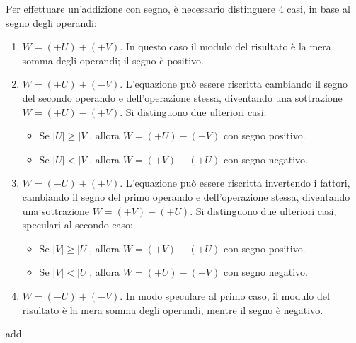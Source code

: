 Per effettuare un'addizione con segno, è necessario distinguere 4 casi, in base al segno degli operandi:
\begin{enumerate}
	\item $W = (+U) + (+V)$. In questo caso il modulo del risultato è la mera somma degli operandi; il segno è positivo.
	\item $W = (+U) + (-V)$. L'equazione può essere riscritta cambiando il segno del secondo operando e dell'operazione stessa, diventando una sottrazione $W = (+U) - (+V)$. Si distinguono due ulteriori casi:
	\begin{itemize}
		\item Se $\lvert U \rvert \geq \lvert V \rvert$, allora $W = (+U) - (+V)$ con segno positivo.
		\item Se $\lvert U \rvert < \lvert V \rvert$, allora $W = (+V) - (+U)$ con segno negativo.
	\end{itemize}
	\item $W = (-U) + (+V)$. L'equazione può essere riscritta invertendo i fattori, cambiando il segno del primo operando e dell'operazione stessa, diventando una sottrazione $W = (+V) - (+U)$. Si distinguono due ulteriori casi, speculari al secondo caso:
	\begin{itemize}
		\item Se $\lvert V \rvert \geq \lvert U \rvert$, allora $W = (+V) - (+U)$ con segno positivo.
		\item Se $\lvert V \rvert < \lvert U \rvert$, allora $W = (+U) - (+V)$ con segno negativo.
	\end{itemize}
	\item $W = (-U) + (-V)$. In modo speculare al primo caso, il modulo del risultato è la mera somma degli operandi, mentre il segno è negativo.
\end{enumerate}

\begin{algorithm}[H]
	\caption{add}
	\label{alg:add}
	\DontPrintSemicolon
\end{algorithm}

